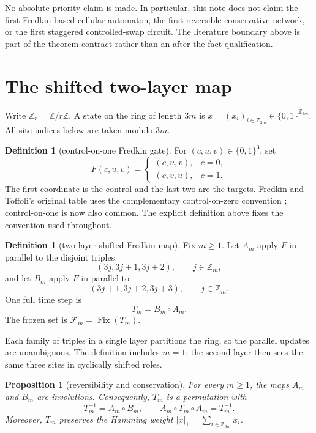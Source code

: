 \documentclass[11pt,a4paper]{amsart}
\newtheorem{proposition}[theorem]{Proposition}
\theoremstyle{definition}
\newtheorem{definition}[theorem]{Definition}
\theoremstyle{remark}
\newcommand{\Fix}{\operatorname{Fix}}
\newcommand{\Fset}{\mathcal F}
\begin{document}
No absolute priority claim is made.  In particular, this note does not claim
the first Fredkin-based cellular automaton, the first reversible conservative
network, or the first staggered controlled-swap circuit.  The literature
boundary above is part of the theorem contract rather than an after-the-fact
qualification.

\section{The shifted two-layer map}

Write $\mathbb Z_r=\mathbb Z/r\mathbb Z$.  A state on the ring of length
$3m$ is $x=(x_i)_{i\in\mathbb Z_{3m}}\in\{0,1\}^{\mathbb Z_{3m}}$.  All site
indices below are taken modulo $3m$.

\begin{definition}[control-on-one Fredkin gate]
For $(c,u,v)\in\{0,1\}^3$, set
\[
 F(c,u,v)=
 \begin{cases}
  (c,u,v),&c=0,\\
  (c,v,u),&c=1.
 \end{cases}
\]
The first coordinate is the control and the last two are the targets.
Fredkin and Toffoli's original table uses the complementary control-on-zero
convention \cite{FredkinToffoli1982}; control-on-one is now also common.  The
explicit definition above fixes the convention used throughout.
\end{definition}

\begin{definition}[two-layer shifted Fredkin map]\label{def:dynamics}
Fix $m\geq1$.  Let $A_m$ apply $F$ in parallel to the disjoint triples
\[
 (3j,3j+1,3j+2),\qquad j\in\mathbb Z_m,
\]
and let $B_m$ apply $F$ in parallel to
\[
 (3j+1,3j+2,3j+3),\qquad j\in\mathbb Z_m.
\]
One full time step is
\[
 T_m=B_m\circ A_m.
\]
The frozen set is $\Fset_m=\Fix(T_m)$.
\end{definition}

Each family of triples in a single layer partitions the ring, so the parallel
updates are unambiguous.  The definition includes $m=1$: the second layer
then sees the same three sites in cyclically shifted roles.

\begin{proposition}[reversibility and conservation]\label{prop:reversible}
For every $m\geq1$, the maps $A_m$ and $B_m$ are involutions.  Consequently,
$T_m$ is a permutation with
\[
 T_m^{-1}=A_m\circ B_m,
 \qquad
 A_m\circ T_m\circ A_m=T_m^{-1}.
\]
Moreover, $T_m$ preserves the Hamming weight
$|x|_1=\sum_{i\in\mathbb Z_{3m}}x_i$.
\end{proposition}
\end{document}
